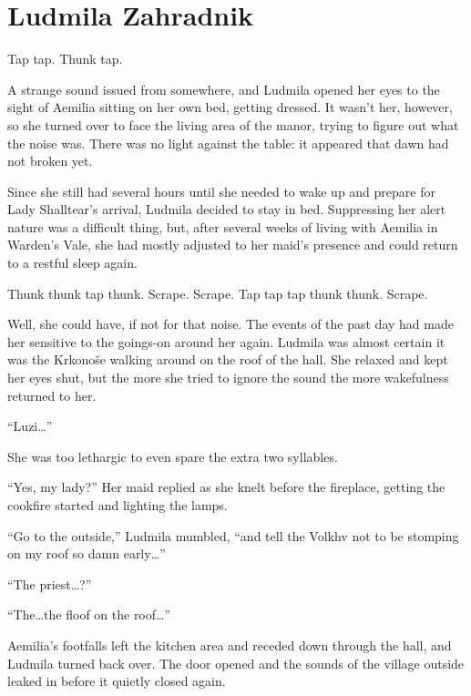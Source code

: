 \chapter{Ludmila Zahradnik}

Tap tap. Thunk tap.

 

A strange sound issued from somewhere, and Ludmila opened her eyes to the sight of Aemilia sitting on her own bed, getting dressed. It wasn’t her, however, so she turned over to face the living area of the manor, trying to figure out what the noise was. There was no light against the table: it appeared that dawn had not broken yet.

 

Since she still had several hours until she needed to wake up and prepare for Lady Shalltear’s arrival, Ludmila decided to stay in bed. Suppressing her alert nature was a difficult thing, but, after several weeks of living with Aemilia in Warden’s Vale, she had mostly adjusted to her maid’s presence and could return to a restful sleep again.

 

Thunk thunk tap thunk. Scrape. Scrape. Tap tap tap thunk thunk. Scrape.

 

Well, she could have, if not for that noise. The events of the past day had made her sensitive to the goings-on around her again. Ludmila was almost certain it was the Krkonoše walking around on the roof of the hall. She relaxed and kept her eyes shut, but the more she tried to ignore the sound the more wakefulness returned to her.

 

“Luzi…”

 

She was too lethargic to even spare the extra two syllables.

 

“Yes, my lady?” Her maid replied as she knelt before the fireplace, getting the cookfire started and lighting the lamps.

 

“Go to the outside,” Ludmila mumbled, “and tell the Volkhv not to be stomping on my roof so damn early…”

 

“The priest…?”

 

“The…the floof on the roof…”

 

Aemilia’s footfalls left the kitchen area and receded down through the hall, and Ludmila turned back over. The door opened and the sounds of the village outside leaked in before it quietly closed again.

